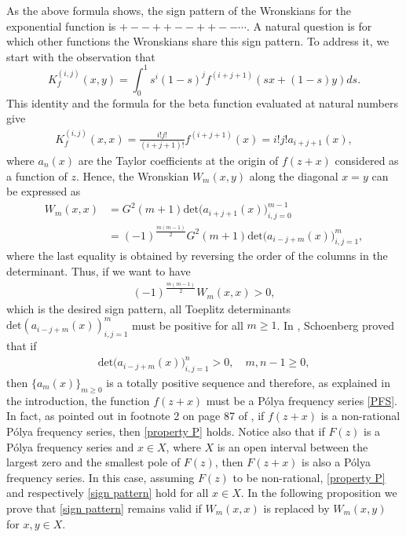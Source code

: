 \documentclass[twoside,a4paper]{amsart}
\renewcommand{\det}{\mathrm{det}}
\theoremstyle{remark}
\begin{document}
As the above formula shows,  the sign pattern of the Wronskians for the exponential function is \( +--++--++--\cdots\).  A natural question is for which other functions the Wronskians share this sign pattern. To address it, we start with the observation that 
\[
K_f^{(i,j)}(x,y) = \int_0^1 s^i(1-s)^jf^{(i+j+1)}(sx+(1-s)y)ds.
\]
This identity and the formula for the beta function evaluated at natural numbers give
\begin{align}
\label{der K}
K_f^{(i,j)}(x,x) = \frac{i!j!}{(i+j+1)!} f^{(i+j+1)}(x) = i!j! a_{i+j+1}(x),
\end{align}
where \( a_n(x) \) are the Taylor coefficients at the origin of \( f(z+x)\) considered as a function of \( z \). Hence, the Wronskian \( W_m(x,y)\) along the diagonal \( x=y\) can be expressed as
\begin{align}
W_m(x,x) &= G^2(m+1) \det\big( a_{i+j+1}(x) \big)_{i,j=0}^{m-1} \\
& = (-1)^{\frac{m(m-1)}2}G^2(m+1)\det\big( a_{i-j+m}(x) \big)_{i,j=1}^m,
\end{align}
where the last equality is obtained by reversing the order of the columns in the determinant. Thus, if we want to have
\begin{align}
\label{sign pattern}
(-1)^{\frac{m(m-1)}2}W_m(x,x)>0,
\end{align}
which is the desired sign pattern, all Toeplitz determinants \( \det( a_{i-j+m}(x))_{i,j=1}^m \) must be positive for all \( m\geq 1 \).  In \cite{MR1545467}, Schoenberg proved that if 
\begin{align}
\label{property P}
\det\big( a_{i-j+m}(x) \big)_{i,j=1}^n>0, \quad m,n-1 \geq 0,
\end{align}
then \( \{ a_m(x) \}_{m\geq0} \) is a totally positive sequence and therefore, as explained in the introduction, the function \( f(z+x)\) must be a P\'olya frequency series \eqref{PFS}. In fact, as pointed out in footnote 2 on page 87 of \cite{MR53176}, if \( f(z+x) \) is a non-rational P\'olya frequency series, then \eqref{property P} holds. Notice also that if \( F(z) \) is a P\'olya frequency series and \( x\in X \), where \( X \) is an open interval between the largest zero and the smallest pole  of \( F(z) \), then \( F(z+x) \) is also a P\'olya frequency series. In this case, assuming \( F(z) \) to be non-rational, \eqref{property P} and respectively \eqref{sign pattern} hold for all \( x\in X \). In the following proposition we prove that \eqref{sign pattern} remains valid if \( W_m(x,x) \) is replaced by \( W_m(x,y) \) for \( x,y\in X \).
\end{document}
